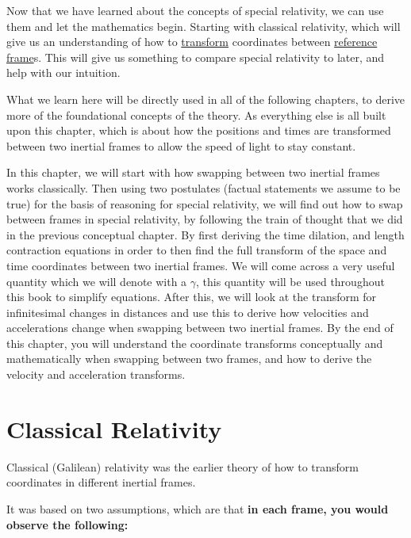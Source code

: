 Now that we have learned about the concepts of special relativity, we can use them and let the mathematics begin.
Starting with classical relativity, which will give us an understanding of how to \hyperlink{def-transform}{transform} coordinates between \hyperlink{def-Reference-frame}{reference frame}s.
This will give us something to compare special relativity to later, and help with our intuition.

What we learn here will be directly used in all of the following chapters, to derive more of the foundational concepts of the theory.
As everything else is all built upon this chapter, which is about how the positions and times are transformed between two inertial frames to allow the speed of light to stay constant.

In this chapter, we will start with how swapping between two inertial frames works classically.
Then using two postulates (factual statements we assume to be true) for the basis of reasoning for special relativity, we will find out how to swap between frames in special relativity, by following the train of thought that we did in the previous conceptual chapter.
By first deriving the time dilation, and length contraction equations in order to then find the full transform of the space and time coordinates between two inertial frames.
We will come across a very useful quantity which we will denote with a ${\gamma}$, this quantity will be used throughout this book to simplify equations.
After this, we will look at the transform for infinitesimal changes in distances and use this to derive how velocities and accelerations change when swapping between two inertial frames.
By the end of this chapter, you will understand the coordinate transforms conceptually and mathematically when swapping between two frames, and how to derive the velocity and acceleration transforms.

\section{Classical Relativity} \label{sect: Classical Relativity}

Classical (Galilean) relativity was the earlier theory of how to transform coordinates in different inertial frames.

It was based on two assumptions, which are that \textbf{in each frame, you would observe the following:}

